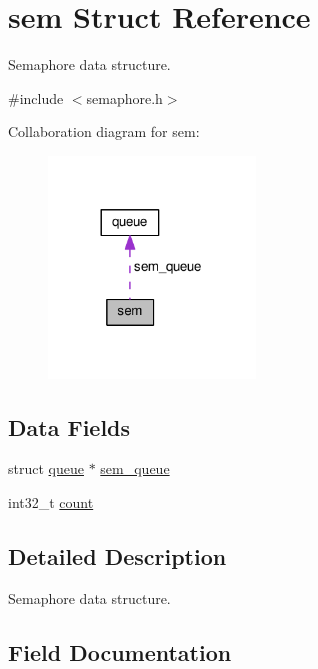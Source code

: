 \hypertarget{structsem}{}\section{sem Struct Reference}
\label{structsem}


Semaphore data structure.  




{\ttfamily \#include $<$semaphore.\+h$>$}



Collaboration diagram for sem\+:\nopagebreak
\begin{figure}[H]
\begin{center}
\leavevmode
\includegraphics[width=156pt]{structsem__coll__graph}
\end{center}
\end{figure}
\subsection*{Data Fields}
\begin{DoxyCompactItemize}
\item 
struct \hyperlink{structqueue}{queue} $\ast$ \hyperlink{structsem_a723ac960b2566b855b905fa4aa324f9b}{sem\+\_\+queue}
\item 
int32\+\_\+t \hyperlink{structsem_a798dc7e825b1e632b2db49b473b17636}{count}
\end{DoxyCompactItemize}


\subsection{Detailed Description}
Semaphore data structure. 

\subsection{Field Documentation}
\mbox{\label{structsem_a798dc7e825b1e632b2db49b473b17636}} 
